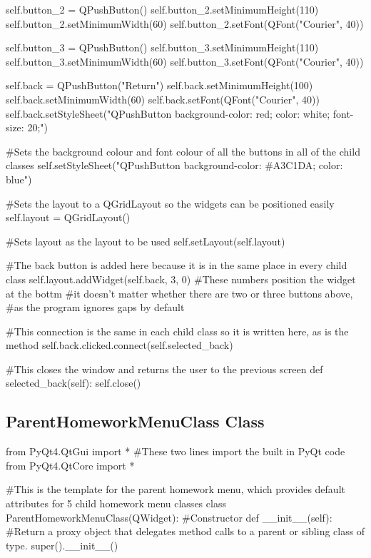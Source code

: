 \begin{landscape}
\begin{python}
        self.button_2 = QPushButton()
        self.button_2.setMinimumHeight(110)
        self.button_2.setMinimumWidth(60)
        self.button_2.setFont(QFont("Courier", 40))
        
        self.button_3 = QPushButton()
        self.button_3.setMinimumHeight(110)
        self.button_3.setMinimumWidth(60)
        self.button_3.setFont(QFont("Courier", 40))
   
        self.back = QPushButton("Return")
        self.back.setMinimumHeight(100)
        self.back.setMinimumWidth(60)
        self.back.setFont(QFont("Courier", 40))
        self.back.setStyleSheet("QPushButton {background-color: red; color: white; font-size: 20;}")

        #Sets the background colour and font colour of all the buttons in all of the child classes
        self.setStyleSheet("QPushButton {background-color: #A3C1DA; color: blue}")

        #Sets the layout to a QGridLayout so the widgets can be positioned easily
        self.layout = QGridLayout()

        #Sets layout as the layout to be used
        self.setLayout(self.layout)

        #The back button is added here because it is in the same place in every child class
        self.layout.addWidget(self.back, 3, 0) #These numbers position the widget at the bottm
                                               #it doesn't matter whether there are two or three buttons above,
                                               #as the program ignores gaps by default

        #This connection is the same in each child class so it is written here, as is the method
        self.back.clicked.connect(self.selected_back)

    #This closes the window and returns the user to the previous screen
    def selected_back(self):
        self.close()
\end{python}

\subsection{ParentHomeworkMenuClass Class}

\begin{python}
from PyQt4.QtGui import * #These two lines import the built in PyQt code
from PyQt4.QtCore import *

#This is the template for the parent homework menu, which provides default attributes for 5 child homework menu classes
class ParentHomeworkMenuClass(QWidget):
    #Constructor
    def __init__(self):
        #Return a proxy object that delegates method calls to a parent or sibling class of type.
        super().__init__()


\end{python}
\end{landscape}
